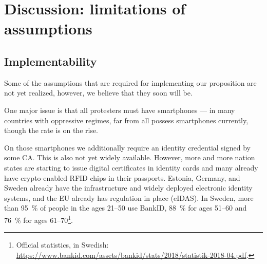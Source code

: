 \section{Discussion: limitations of assumptions}%
\label{Discussion}

\subsection{Implementability}

Some of the assumptions that are required for implementing our proposition are 
not yet realized, however, we believe that they soon will be.

One major issue is that all protesters must have smartphones --- in many 
countries with oppressive regimes, far from all possess smartphones
currently, though the rate is on the rise.

On those smartphones we additionally require an identity credential
signed by some \ac{CA}.  This is also not yet widely available.
However, more and more nation states are starting to issue digital
certificates in identity cards and many already have crypto-enabled
RFID chips in their passports.  \Eg Estonia, Germany, and Sweden
already have the infrastructure and widely deployed electronic
identity systems, and the EU already has regulation in place (eIDAS).
In Sweden, more than \SI{95}{\%} of people in the ages 21--50 use 
BankID, \SI{88}{\%} for ages 51--60 and \SI{76}{\%} for ages 61--70\footnote{%
  Official statistics, in Swedish:  
  \url{https://www.bankid.com/assets/bankid/stats/2018/statistik-2018-04.pdf}.
}. 

